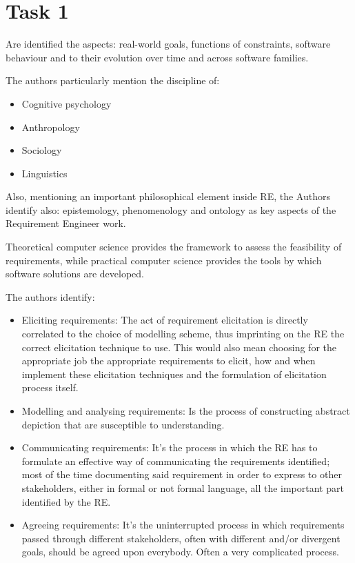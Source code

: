 \chapter{Task 1}
\begin{elenco}
	\item Are identified the aspects: real-world goals, functions of constraints, software behaviour and to their evolution over time and across software families.
	\item The authors particularly mention the discipline of:
	\begin{itemize}
		\item Cognitive psychology
		\item Anthropology
		\item Sociology
		\item Linguistics
	\end{itemize}
	Also, mentioning an important philosophical element inside RE, the Authors identify also: epistemology, phenomenology and ontology as key aspects of the Requirement Engineer work.
	\item Theoretical computer science provides the framework to assess the feasibility of requirements, while practical computer science provides the tools by which software solutions are developed.
	\item The authors identify:
	\begin{itemize}
		\item Eliciting requirements: The act of requirement elicitation is directly correlated to the choice of modelling scheme, thus imprinting on the RE the correct elicitation technique to use. This would also mean choosing for the appropriate job the appropriate requirements to elicit, how and when implement these elicitation techniques and the formulation of elicitation process itself.
		\item Modelling and analysing requirements: Is the process of constructing abstract depiction that are susceptible to understanding. 
		\item Communicating requirements: It's the process in which the RE has to formulate an effective way of communicating the requirements identified; most of the time documenting said requirement in order to express to other stakeholders, either in formal or not formal language, all the important part identified by the RE. 
		\item Agreeing requirements: It's the uninterrupted process in which requirements passed through different stakeholders, often with different and/or divergent goals, should be agreed upon everybody. Often a very complicated process.

\end{itemize}
\end{elenco}
